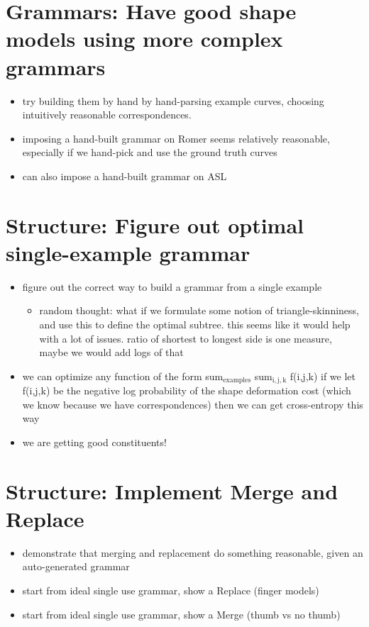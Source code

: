 \documentclass{book}
\begin{document}
\section{Grammars: Have good shape models using more complex grammars}
\label{sec-7_14}


\begin{itemize}
\item try building them by hand by hand-parsing example curves,
      choosing intuitively reasonable correspondences.
\item imposing a hand-built grammar on Romer seems relatively
      reasonable, especially if we hand-pick and use the ground truth
      curves
\item can also impose a hand-built grammar on ASL
\end{itemize}
\section{Structure: Figure out optimal single-example grammar}
\label{sec-7_15}

\begin{itemize}
\item figure out the correct way to build a grammar from a single example

\begin{itemize}
\item random thought: what if we formulate some notion of
      triangle-skinniness, and use this to define the optimal
      subtree. this seems like it would help with a lot of
      issues. ratio of shortest to longest side is one measure, maybe
      we would add logs of that
\end{itemize}

\item we can optimize any function of the form sum$_{\mathrm{examples}}$
    sum$_{\mathrm{i,j,k}}$ f(i,j,k) if we let f(i,j,k) be the negative log
    probability of the shape deformation cost (which we know because
    we have correspondences) then we can get cross-entropy this way
\item we are getting good constituents!
\end{itemize}
\section{Structure: Implement Merge and Replace}
\label{sec-7_16}

\begin{itemize}
\item demonstrate that merging and replacement do something reasonable,
    given an auto-generated grammar
\item start from ideal single use grammar, show a Replace (finger models)
\item start from ideal single use grammar, show a Merge (thumb vs no thumb)
\end{itemize}
\end{document}
